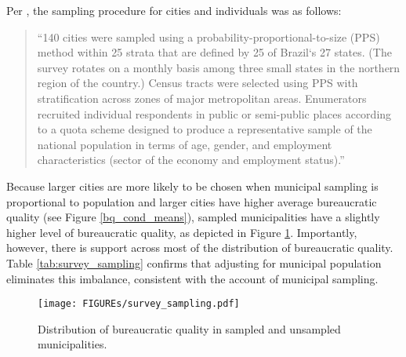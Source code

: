 \documentclass[11pt,english]{article}
\begin{document}
Per \citet{weitzshapirowintersapp}, the sampling procedure for cities and individuals was as follows:
\begin{quote}
``140 cities were sampled using a probability-proportional-to-size (PPS) method within 25 strata
that are defined by 25 of Brazil‘s 27 states. (The survey rotates on a monthly basis among three
small states in the northern region of the country.) Census tracts were selected using PPS with
stratification across zones of major metropolitan areas. Enumerators recruited individual
respondents in public or semi-public places according to a quota scheme designed to produce a
representative sample of the national population in terms of age, gender, and employment
characteristics (sector of the economy and employment status).'' \citep[][p. 4]{weitzshapirowintersapp}
\end{quote}
Because larger cities are more likely to be chosen when municipal sampling is proportional to population and larger cities have higher average bureaucratic quality (see Figure \ref{bq_cond_means}), sampled municipalities have a slightly higher level of bureaucratic quality, as depicted in Figure \ref{fig:survey_samp}. Importantly, however, there is support across most of the distribution of bureaucratic quality. Table \ref{tab:survey_sampling} confirms that adjusting for municipal population eliminates this imbalance, consistent with the account of municipal sampling. \\
\begin{figure}
\centering
\texttt{[image: FIGUREs/survey\_sampling.pdf]}
\caption{Distribution of bureaucratic quality in sampled and unsampled municipalities.}\label{fig:survey_samp}
\end{figure}
\end{document}
